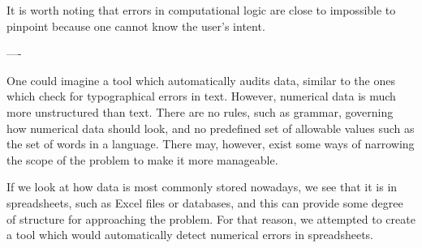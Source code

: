 It is worth noting that errors in computational logic are close to
impossible to pinpoint because one cannot know the user's intent.


----

One could imagine a tool which automatically audits data, similar to
the ones which check for typographical errors in text.  However,
numerical data is much more unstructured than text.  There are no
rules, such as grammar, governing how numerical data should look, and
no predefined set of allowable values such as the set of words in a
language.  There may, however, exist some ways of narrowing the scope
of the problem to make it more manageable.

If we look at how data is most commonly stored nowadays, we see that
it is in spreadsheets, such as Excel files or databases, and this can
provide some degree of structure for approaching the problem.  For
that reason, we attempted to create a tool which would automatically
detect numerical errors in spreadsheets.  


